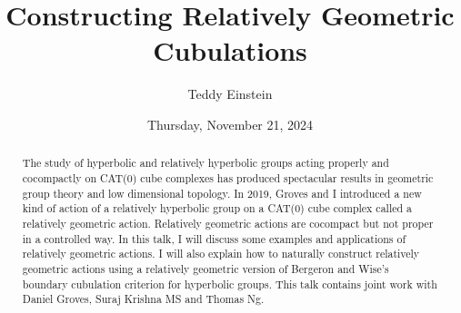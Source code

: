 \documentclass{UAmathtalk}
\author{Teddy Einstein}
\title{Constructing Relatively Geometric Cubulations}
\date{Thursday, November 21, 2024}
\begin{document}
\maketitle

\begin{abstract}
The study of hyperbolic and relatively hyperbolic groups acting properly and cocompactly on CAT(0) cube complexes has produced spectacular results in geometric group theory and low dimensional topology. In 2019, Groves and I introduced a new kind of action of a relatively hyperbolic group on a CAT(0) cube complex called a relatively geometric action. Relatively geometric actions are cocompact but not proper in a controlled way. In this talk, I will discuss some examples and applications of relatively geometric actions. I will also explain how to naturally construct relatively geometric actions using a relatively geometric version of Bergeron and Wise's boundary cubulation criterion for hyperbolic groups. This talk contains joint work with Daniel Groves, Suraj Krishna MS and Thomas Ng.
\end{abstract}
\end{document}
